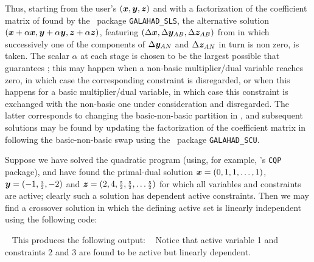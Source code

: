\documentclass{galahad}
\begin{document}
Thus, starting from the user's $({\bm{x}}, {\bm{y}}, {\bm{z}})$
and with a factorization of the coefficient matrix of 
found by the \galahad\ package {\tt GALAHAD\_SLS},
the alternative solution
$({\bm{x}} + \alpha {\bm{x}}, {\bm{y}} + \alpha {\bm{y}}, {\bm{z}} + \alpha {\bm{z}})$,
featuring
$(\Delta {\bm{x}}, \Delta {\bm{y}}_{AB}, \Delta {\bm{z}}_{AB})$
from 
in which successively one of the components of $\Delta {\bm{y}}_{AN}$
and $\Delta {\bm{z}}_{AN}$ in turn is non zero, is taken.
The scalar $\alpha$ at each stage
is chosen to be the largest possible that guarantees ;
this may happen when a non-basic multiplier/dual variable reaches zero,
in which case the corresponding constraint is disregarded, or when this
happens for a basic multiplier/dual variable, in which case this constraint is
exchanged with the non-basic one under consideration and disregarded.
The latter corresponds to changing the basic-non-basic partition
in , and subsequent solutions may be found by updating
the factorization of the coefficient matrix in 
following the basic-non-basic swap using the
\galahad\ package {\tt GALAHAD\_SCU}.


\galexample
Suppose we have solved the quadratic program
(using, for example, \galahad's {\tt CQP} package), and have found
the primal-dual solution ${\bm{x}} = (0,1,1, \ldots, 1)$,
${\bm{y}} = ( -1, {\scriptstyle \frac{3}{2}}, -2)$ and
${\bm{z}} = ( 2, 4, {\scriptstyle \frac{5}{2}}, {\scriptstyle \frac{5}{2}}, \ldots {\scriptstyle \frac{5}{2}})$
for which all variables and constraints are active; clearly such
a solution has dependent active constraints.
Then we may find a crossover solution in which the defining
active set is linearly independent using the following code:

{\tt \small
\VerbatimInput{\packageexample}
}
\noindent
This produces the following output:
{\tt \small
\VerbatimInput{\packageresults}
}
\noindent
Notice that active variable 1 and constraints 2 and 3 are found to be active but
linearly dependent.
\end{document}
